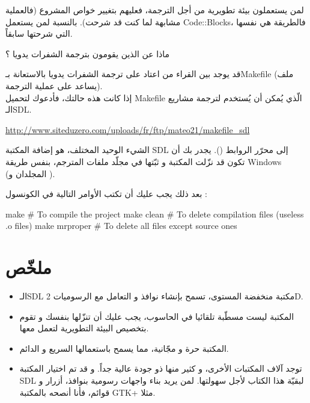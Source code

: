 لمن يستعملون بيئة تطويرية من أجل الترجمة، فعليهم بتغيير خواص المشروع (فالعملية مشابهة لما كنت قد شرحت). بالنسبة لمن يستعمل
\textenglish{Code::Blocks}،
فالطريقة هي نفسها التي شرحتها سابقاً.

\begin{question}
 ماذا عن الذين يقومون بترجمة الشفرات يدويا ؟
\end{question}

قد يوجد بين القراء من اعتاد على ترجمة الشفرات يدويا بالاستعانة بـ\textenglish{Makefile}
(ملف يساعد على عملية الترجمة).\\
إذا كانت هذه حالتك، فأدعوك لتحميل
\textenglish{Makefile}
الّذي يُمكن أن يُستخدم لترجمة مشاريع الـ\textenglish{SDL}.

\url{http://www.siteduzero.com/uploads/fr/ftp/mateo21/makefile_sdl}

الشيء الوحيد المختلف، هو إضافة المكتبة
\textenglish{SDL}
إلى محرّر الروابط
().
يجدر بك أن تكون قد نزّلت المكتبة و ثبّتها في مجلّد ملفات المترجم، بنفس طريقة
\textenglish{Windows}
(المجلدان
و 
).

بعد ذلك يجب عليك أن تكتب الأوامر التالية في الكونسول :

\begin{Console}
make      	# To compile the project
make clean	# To delete compilation files (useless .o files)
make mrproper	# To delete all files except source ones
\end{Console}

\section*{ملخّص}

\begin{itemize}
	\item الـ\textenglish{SDL}
	مكتبة منخفضة المستوى، تسمح بإنشاء نوافذ و التعامل مع الرسوميات
	\textenglish{2D}.
	\item المكتبة ليست مسطّبة تلقائيا في الحاسوب، يجب عليك أن تنزّلها بنفسك و تقوم بتخصيص البيئة التطويرية لتعمل معها.
	\item المكتبة حرة و مجّانية، مما يسمح باستعمالها السريع و الدائم.
	\item توجد آلاف المكتبات الأخرى، و كثير منها ذو جودة عالية جداً. و قد تم اختيار المكتبة 
	\textenglish{SDL}
	لبقيّة هذا الكتاب لأجل سهولتها. لمن يريد بناء واجهات رسومية بنوافذ، أزرار و قوائم، فأنا أنصحه بالمكتبة 
	\textenglish{GTK+}
	مثلا.
\end{itemize}
